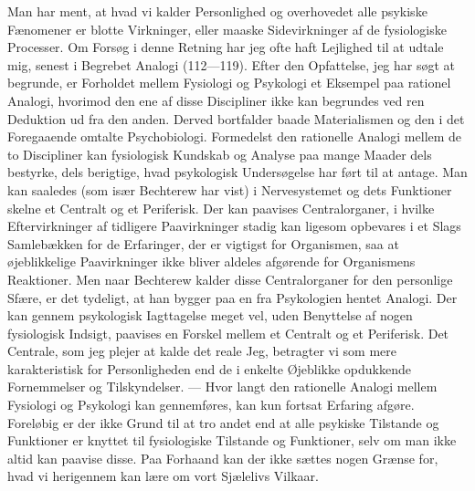 \documentclass[12pt]{article}
\newcommand{\opage}[1]{\marginnote{\footnotesize\textit{[#1]}}}
\begin{document}
\opage{46}Man har ment, at hvad vi kalder Personlighed og overhovedet
alle psykiske Fænomener er blotte Virkninger, eller maaske
Sidevirkninger af de fysiologiske Processer. Om Forsøg i denne Retning
har jeg ofte haft Lejlighed til at udtale mig, senest i
\guillemotright{}Begrebet Analogi\guillemotleft{} (112---119). Efter den
Opfattelse, jeg har søgt at begrunde, er Forholdet mellem Fysiologi og
Psykologi et Eksempel paa rationel Analogi, hvorimod den ene af disse
Discipliner ikke kan begrundes ved ren Deduktion ud fra den anden.
Derved bortfalder baade Materialismen og den i det Foregaaende omtalte
\guillemotright{}Psychobiologi\guillemotleft{}. Formedelst den rationelle
Analogi mellem de to Discipliner kan fysiologisk Kundskab og Analyse
paa mange Maader dels bestyrke, dels berigtige, hvad psykologisk
Undersøgelse har ført til at antage. Man kan saaledes (som især
Bechterew har vist) i Nervesystemet og dets Funktioner skelne et
Centralt og et Periferisk. Der kan paavises Centralorganer, i hvilke
Eftervirkninger af tidligere Paavirkninger stadig kan ligesom
opbevares i et Slags \guillemotright{}Samlebækken\guillemotleft{} for de
Erfaringer, der er vigtigst for Organismen, saa at øjeblikkelige
Paavirkninger ikke bliver aldeles afgørende for Organismens
Reaktioner. Men naar Bechterew kalder disse Centralorganer for
\guillemotright{}den personlige Sfære\guillemotleft{}, er det tydeligt, at
han bygger paa en fra Psykologien hentet Analogi. Der kan gennem
psykologisk Iagttagelse meget vel, uden Benyttelse af nogen
fysiologisk Indsigt, paavises en Forskel mellem et Centralt og et
Periferisk. Det Centrale, som jeg plejer at kalde det reale Jeg,
betragter vi som mere karakteristisk for Personligheden end de i
enkelte Øjeblikke opdukkende Fornemmelser og Tilskyndelser. --- Hvor
langt den rationelle Analogi mellem Fysiologi og Psykologi kan
gennemføres, kan kun fortsat Erfaring afgøre. Foreløbig er der ikke
Grund til at tro andet end
\setcounter{footnote}{0}%
\opage{47}at alle psykiske Tilstande og Funktioner er knyttet til
fysiologiske Tilstande og Funktioner, selv om man ikke altid kan
paavise disse. Paa Forhaand kan der ikke sættes nogen Grænse for, hvad
vi herigennem kan lære om vort Sjælelivs Vilkaar.
\end{document}
